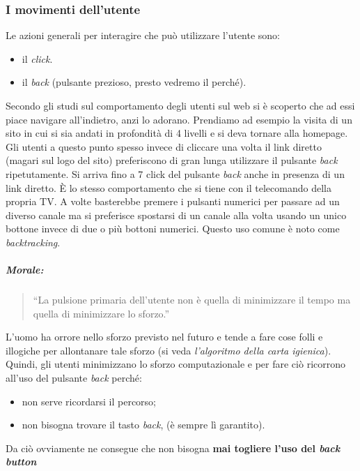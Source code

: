 		\subsubsection{I movimenti dell'utente}
			Le azioni generali per interagire che può utilizzare l'utente sono:
			\begin{itemize}
				\item il \emph{click}.
				\item il \emph{back} (pulsante prezioso, presto vedremo il perché).
			\end{itemize}
			Secondo gli studi sul comportamento degli utenti sul web si è scoperto che ad essi piace navigare all'indietro, anzi lo adorano. Prendiamo ad esempio la visita di un sito in cui si sia andati in profondità di 4 livelli e si deva tornare alla homepage. Gli utenti a questo punto spesso invece di cliccare una volta  il link diretto (magari sul logo del sito) preferiscono di gran lunga utilizzare il pulsante \emph{back} ripetutamente.
			Si arriva fino a 7 click del pulsante \emph{back} anche in presenza di un link diretto. È lo stesso comportamento che si tiene con il telecomando della propria TV. A volte basterebbe premere i pulsanti numerici per passare ad un diverso canale ma si preferisce spostarsi di un canale alla volta usando un unico bottone invece di due o più bottoni numerici. Questo uso comune è noto come \emph{backtracking}.
			\subparagraph*{Morale:}
			\begin{quote}
				``La pulsione primaria dell'utente non è quella di minimizzare il tempo ma quella di minimizzare lo sforzo.''
			\end{quote}
			L'uomo ha orrore nello sforzo previsto nel futuro e tende a fare cose folli e illogiche per allontanare tale sforzo (si veda \emph{l'algoritmo della carta igienica}). Quindi, gli utenti minimizzano lo sforzo computazionale e per fare ciò ricorrono all'uso del pulsante \emph{back} perché:
			\begin{itemize}
				\item non serve ricordarsi il percorso;
				\item non bisogna trovare il tasto \emph{back}, (è sempre lì garantito).
			\end{itemize}
			Da ciò ovviamente ne consegue che non bisogna \textbf{mai togliere l'uso del \emph{back button}}
			

